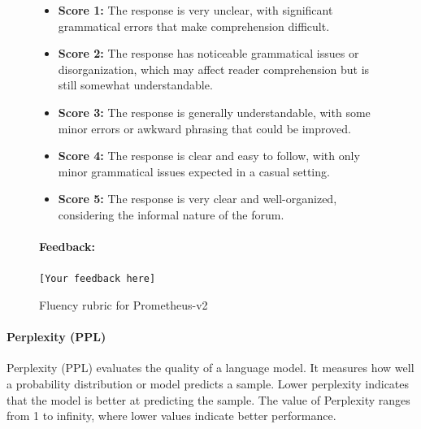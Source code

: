 \begin{figure}[ht!]
\begin{tcolorbox}[colback=gray!10, colframe=black, title=Fluency Evaluation]
\begin{itemize}
    \item \textbf{Score 1:} The response is very unclear, with significant grammatical errors that make comprehension difficult.
    \item \textbf{Score 2:} The response has noticeable grammatical issues or disorganization, which may affect reader comprehension but is still somewhat understandable.
    \item \textbf{Score 3:} The response is generally understandable, with some minor errors or awkward phrasing that could be improved.
    \item \textbf{Score 4:} The response is clear and easy to follow, with only minor grammatical issues expected in a casual setting.
    \item \textbf{Score 5:} The response is very clear and well-organized, considering the informal nature of the forum.
\end{itemize}

\paragraph{Feedback:}
\texttt{[Your feedback here]}

\end{tcolorbox}
\caption{Fluency rubric for Prometheus-v2}
\label{app:rubric}
\end{figure}


\paragraph{Perplexity (PPL)}
Perplexity (PPL) evaluates the quality of a language model. It measures how well a probability distribution or model predicts a sample. Lower perplexity indicates that the model is better at predicting the sample. The value of Perplexity ranges from 1 to infinity, where lower values indicate better performance. 

